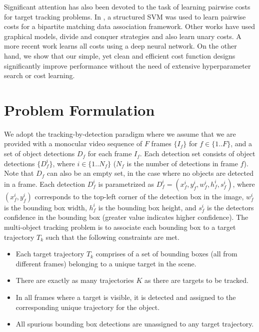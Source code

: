 \documentclass[letterpaper, 10 pt, conference]{ieeeconf}
\begin{document}
Significant attention has also been devoted to the task of learning pairwise costs for target tracking problems. In \cite{ijcv2017}, a structured SVM was used to learn pairwise costs for a bipartite matching data association framework. Other works have used graphical models, divide and conquer strategies and also learn unary costs. A more recent work \cite{DeepNetworkFlow} learns all costs using a deep neural network. On the other hand, we show that our simple, yet clean and efficient cost function designs significantly improve performance without the need of extensive hyperparameter search or cost learning.

\section{Problem Formulation}

We adopt the tracking-by-detection paradigm where we assume that we are provided with a monocular video sequence of $F$ frames $\{I_f\}$ for $f \in \{1 .. F\}$, and a set of object detections $D_f$ for each frame $I_f$. Each detection set consists of object detections $\{D^i_f\}$, where $i \in \{1 .. N_f\}$ ($N_f$ is the number of detections in frame $f$). Note that $D_f$ can also be an empty set, in the case where no objects are detected in a frame. Each detection $D^i_f$ is parametrized as $D^i_f = (x^i_f, y^i_f, w^i_f, h^i_f, s^i_f)$, where $(x^i_f,y^i_f)$ corresponds to the top-left corner of the detection box in the image, $w^i_f$ is the bounding box width, $h^i_f$ is the bounding box height, and $s^i_f$ is the detectors confidence in the bounding box (greater value indicates higher confidence). The multi-object tracking problem is to associate each bounding box to a target trajectory $T_k$ such that the following constraints are met. 
\begin{itemize}
\item Each target trajectory $T_k$ comprises of a set of bounding boxes (all from different frames) belonging to a unique target in the scene.
\item There are exactly as many trajectories $K$ as there are targets to be tracked.
\item In all frames where a target is visible, it is detected and assigned to the corresponding unique trajectory for the object.
\item All spurious bounding box detections are unassigned to any target trajectory.
\end{itemize}
\end{document}
